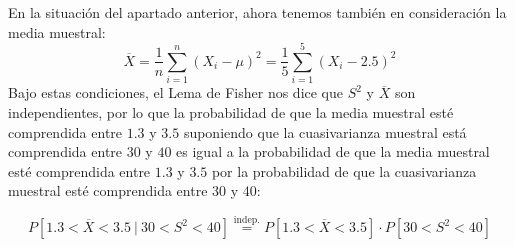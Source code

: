 \begin{ejercicio}
\begin{enumerate}[label=\alph*)]
            En la situación del apartado anterior, ahora tenemos también en consideración la media muestral:
            \begin{equation*}
                \overline{X} = \dfrac{1}{n}\sum_{i=1}^n {(X_i -\mu)}^{2} = \dfrac{1}{5}\sum_{i=1}^{5}{(X_i - 2.5)}^{2}
            \end{equation*} %
            Bajo estas condiciones, el Lema de Fisher nos dice que $S^2$ y $\overline{X}$ son independientes, por lo que la probabilidad de que la media muestral esté comprendida entre $1.3$ y $3.5$ suponiendo que la cuasivarianza muestral está comprendida entre $30$ y $40$ es igual a la probabilidad de que la media muestral esté comprendida entre $1.3$ y $3.5$ por la probabilidad de que la cuasivarianza muestral esté comprendida entre $30$ y $40$:

            \begin{equation*}
                P[1.3<\overline{X}<3.5\ |\ 30 < S^2 < 40] \stackrel{\text{indep.}}{=}P[1.3<\overline{X}<3.5]\cdot P[30<S^2<40]
            \end{equation*}


\end{enumerate}
\end{ejercicio}
